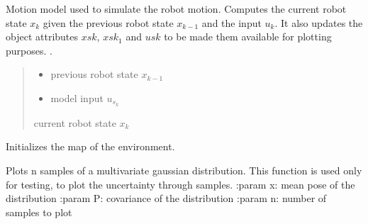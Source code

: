 \documentclass[letterpaper,10pt,english]{sphinxmanual}
\begin{document}
\begin{fulllineitems}
\begin{fulllineitems}
\label{\detokenize{robot_simulation:SimulatedRobot.SimulatedRobot.fs}}
\pysigstartsignatures
{}
\pysigstopsignatures
\sphinxAtStartPar
Motion model used to simulate the robot motion. Computes the current robot state \(x_k\) given the previous robot state \(x_{k-1}\) and the input \(u_k\).
It also updates the object attributes \(xsk\), \(xsk_1\) and  \(usk\) to be made them available for plotting purposes.
.
\begin{quote}\begin{description}
\begin{itemize}
\item {} 
\sphinxAtStartPar
{} \textendash{} previous robot state \(x_{k-1}\)

\item {} 
\sphinxAtStartPar
{} \textendash{} model input \(u_{s_k}\)

\end{itemize}

\sphinxAtStartPar
current robot state \(x_k\)

\end{description}\end{quote}

\end{fulllineitems}


\begin{fulllineitems}
\label{\detokenize{robot_simulation:SimulatedRobot.SimulatedRobot.SetMap}}
\pysigstartsignatures
{}
\pysigstopsignatures
\sphinxAtStartPar
Initializes the map of the environment.

\end{fulllineitems}


\begin{fulllineitems}
\label{\detokenize{robot_simulation:SimulatedRobot.SimulatedRobot._PlotSample}}
\pysigstartsignatures
{}
\pysigstopsignatures
\sphinxAtStartPar
Plots n samples of a multivariate gaussian distribution. This function is used only for testing, to plot the
uncertainty through samples.
:param x: mean pose of the distribution
:param P: covariance of the distribution
:param n: number of samples to plot


\end{fulllineitems}
\end{fulllineitems}
\end{document}
